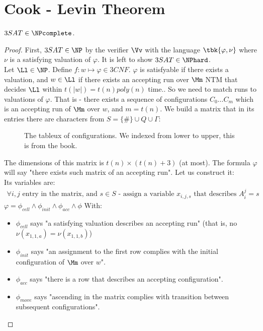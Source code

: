 \section{Cook - Levin Theorem}
\begin{blueBox}
	\begin{thm}
		$3SAT\in \NPcomplete$.
	\end{thm}
\end{blueBox}
\begin{proof}
	First, $3SAT\in \NP$ by the verifier $\Vv$ with the language $\tbk{\varphi, \nu}$ where $\nu$ is a satisfying valuation of $\varphi$. It is left to show $3SAT\in \NPhard$.\\
	Let $\Ll\in \NP$. Define $f:w\mapsto \varphi\in 3CNF$. $\varphi$ is satisfyable if there exists a valuation, and $w\in \Ll$ if there exists an accepting run over $\Mm$ NTM that decides $\Ll$ within $t(|w|) = t(n) poly(n)$ time.. So we need to match runs to valuations of $\varphi$. That is - there exists a sequence of configurations $C_0\ldots C_m$ which is an accepting run of $\Mm$ over $w$, and $m = t(n)$. We build a matrix that in its entries there are characters from $S = \{\#\}\cup Q \cup \Gamma$:
	\begin{figure}[H]
		\centering
		\caption{The tableux of configurations. We indexed from lower to upper, this is from the book.}
	\end{figure}
	The dimensions of this matrix is $t(n) \times  (t(n) + 3)$ (at most). The formula $\varphi$ will say "there exists such matrix of an accepting run". Let us construct it:\\
	Its variables are:
	\begin{align*}
		\forall i,j \text{ entry in the matrix, and } s\in S \text{ - assign a variable } x_{i,j,s}\text{ that describes }A^j_i = s
	\end{align*}
	$\varphi = \phi_{cell}\land \phi_{init} \land \phi_{acc} \land \phi$ With:
	\begin{itemize}
		\item $\phi_{cell}$ says "a satisfying valuation describes an accepting run" (that is, no $\nu(x_{1,1,a}) = \nu(x_{1,1,b})$)
		\item $\phi_{init}$ says "an assignment to the first row complies with the initial configuration of $\Mm$ over $w$".
		\item $\phi_{acc}$ says "there is a row that describes an accepting configuration".
		\item $\phi_{move}$ says "ascending in the matrix complies with transition between subsequent configurations".

\end{itemize}
\end{proof}
